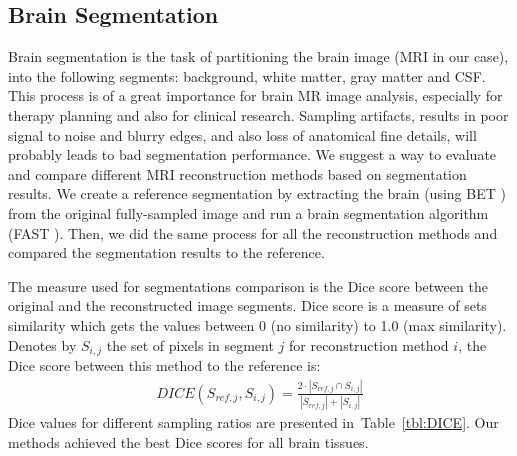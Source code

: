 \documentclass[review]{elsarticle}
\begin{document}
\subsection{Brain Segmentation}
Brain segmentation is the task of partitioning the brain image (MRI in our case), into the following segments: background, white matter, gray matter and CSF. This process is of a great importance for brain MR image analysis, especially for therapy planning and also for clinical research. Sampling artifacts, results in poor signal to noise and blurry edges, and also loss of anatomical fine details, will probably leads to bad segmentation performance.
We suggest a way to evaluate and compare different MRI reconstruction methods based on segmentation results. We create a reference segmentation by extracting the brain (using BET \cite{smith2002fast}) from the original fully-sampled image and run a brain segmentation algorithm (FAST \cite{zhang2001segmentation}). Then, we did the same process for all the reconstruction methods and compared the segmentation results to the reference.

The measure used for segmentations comparison is the Dice score \cite{dice1945measures} between the original and the reconstructed image segments. Dice score is a measure of sets similarity which gets the values between 0 (no similarity) to 1.0 (max similarity). Denotes by $S_{i,j}$ the set of pixels in segment $j$ for reconstruction method $i$, the Dice score between this method to the reference is:
\begin{equation}
\begin{array}{c}
DICE(S_{ref,j},S_{i,j}) = \frac{2\cdot|S_{ref,j} \cap S_{i,j}|} {|S_{ref,j}| + |S_{i,j}|}
\end{array}
\end{equation}
Dice values for different sampling ratios are presented in~Table~\ref{tbl:DICE}. Our methods achieved the best Dice scores for all brain tissues.
\end{document}

